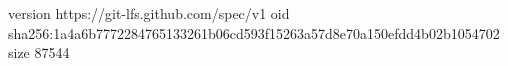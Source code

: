 version https://git-lfs.github.com/spec/v1
oid sha256:1a4a6b7772284765133261b06cd593f15263a57d8e70a150efdd4b02b1054702
size 87544

